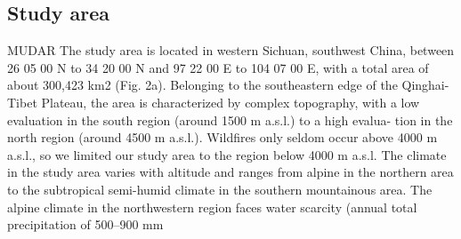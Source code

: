 \subsection{Study area}
MUDAR
The study area is located in western Sichuan, southwest China, between 26 05 00 N to 34 20 00 N and 97 22 00 E to 104 07 00 E, with a
total area of about 300,423 km2
(Fig. 2a). Belonging to the southeastern edge of the Qinghai-Tibet
Plateau, the area is characterized by complex topography, with a low
evaluation in the south region (around 1500 m a.s.l.) to a high evalua-
tion in the north region (around 4500 m a.s.l.). Wildfires only seldom
occur above 4000 m a.s.l., so we limited our study area to the region
below 4000 m a.s.l.
The climate in the study area varies with altitude and ranges from
alpine in the northern area to the subtropical semi-humid climate in the
southern mountainous area. The alpine climate in the northwestern
region faces water scarcity (annual total precipitation of 500–900 mm


